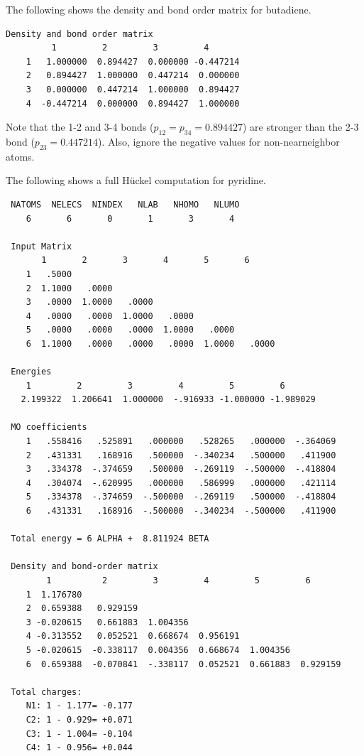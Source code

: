 \documentclass[../Main/chem532-notes.tex]{subfiles}
\begin{document}
\begin{example}
The following shows the density and bond order matrix for butadiene. 
\begin{verbatim}
Density and bond order matrix
         1         2         3         4 
    1   1.000000  0.894427  0.000000 -0.447214
    2   0.894427  1.000000  0.447214  0.000000
    3   0.000000  0.447214  1.000000  0.894427
    4  -0.447214  0.000000  0.894427  1.000000
\end{verbatim}

Note that the 1-2 and 3-4 bonds ($p_{12} = p_{34} = 0.894427$) are stronger than the 2-3 bond ($p_{23} = 0.447214$). Also, ignore the negative values for non-nearneighbor atoms.
\end{example}

\begin{example}
The following shows a full H\"{u}ckel computation for pyridine. 
\begin{verbatim}
 NATOMS  NELECS  NINDEX   NLAB   NHOMO   NLUMO
    6       6       0       1       3       4

 Input Matrix
       1       2       3       4       5       6
    1   .5000
    2  1.1000   .0000
    3   .0000  1.0000   .0000
    4   .0000   .0000  1.0000   .0000
    5   .0000   .0000   .0000  1.0000   .0000
    6  1.1000   .0000   .0000   .0000  1.0000   .0000

 Energies
    1         2         3         4         5         6
   2.199322  1.206641  1.000000  -.916933 -1.000000 -1.989029
 
 MO coefficients 
    1   .558416   .525891   .000000   .528265   .000000  -.364069
    2   .431331   .168916   .500000  -.340234   .500000   .411900
    3   .334378  -.374659   .500000  -.269119  -.500000  -.418804
    4   .304074  -.620995   .000000   .586999   .000000   .421114
    5   .334378  -.374659  -.500000  -.269119   .500000  -.418804
    6   .431331   .168916  -.500000  -.340234  -.500000   .411900
    
 Total energy = 6 ALPHA +  8.811924 BETA

 Density and bond-order matrix
        1          2         3         4         5         6
    1  1.176780 
    2  0.659388   0.929159
    3 -0.020615   0.661883  1.004356
    4 -0.313552   0.052521  0.668674  0.956191
    5 -0.020615  -0.338117  0.004356  0.668674  1.004356
    6  0.659388  -0.070841  -.338117  0.052521  0.661883  0.929159

 Total charges:
	N1: 1 - 1.177= -0.177
	C2: 1 - 0.929= +0.071
	C3: 1 - 1.004= -0.104
	C4: 1 - 0.956= +0.044
\end{verbatim}
\end{example}
\end{document}
